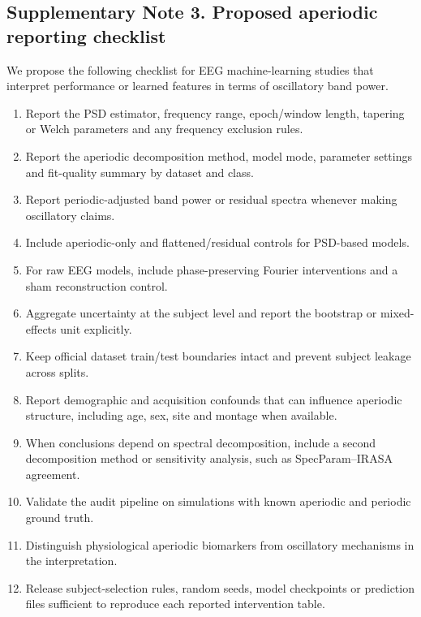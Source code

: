 

\subsection*{Supplementary Note 3. Proposed aperiodic reporting checklist}

We propose the following checklist for EEG machine-learning studies that interpret performance or learned features in terms of oscillatory band power.

\begin{enumerate}
\item Report the PSD estimator, frequency range, epoch/window length, tapering or Welch parameters and any frequency exclusion rules.
\item Report the aperiodic decomposition method, model mode, parameter settings and fit-quality summary by dataset and class.
\item Report periodic-adjusted band power or residual spectra whenever making oscillatory claims.
\item Include aperiodic-only and flattened/residual controls for PSD-based models.
\item For raw EEG models, include phase-preserving Fourier interventions and a sham reconstruction control.
\item Aggregate uncertainty at the subject level and report the bootstrap or mixed-effects unit explicitly.
\item Keep official dataset train/test boundaries intact and prevent subject leakage across splits.
\item Report demographic and acquisition confounds that can influence aperiodic structure, including age, sex, site and montage when available.
\item When conclusions depend on spectral decomposition, include a second decomposition method or sensitivity analysis, such as SpecParam--IRASA agreement.
\item Validate the audit pipeline on simulations with known aperiodic and periodic ground truth.
\item Distinguish physiological aperiodic biomarkers from oscillatory mechanisms in the interpretation.
\item Release subject-selection rules, random seeds, model checkpoints or prediction files sufficient to reproduce each reported intervention table.
\end{enumerate}
